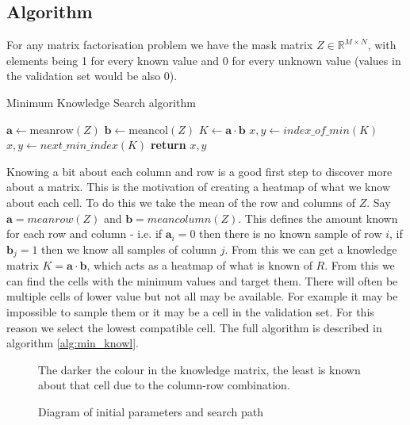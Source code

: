\subsection{Algorithm}
For any matrix factorisation problem we have the mask matrix $Z \in \mathbb{R}^{M \times N}$, with elements being 1 for every known value and 0 for every unknown value (values in the validation set would be also 0).

\begin{algorithm}
\caption{Minimum Knowledge Search algorithm}\label{alg:min_knowl}
\begin{algorithmic}[1]
\State $\mathbf{a} \gets \text{meanrow}(Z)$ 
\State $\mathbf{b} \gets \text{meancol}(Z)$ 
\State $K \gets \mathbf{a} \cdot \mathbf{b}$ 
\State $x,y \gets index\_of\_min(K)$ 
\State $x,y \gets next\_min\_index(K)$
\EndWhile
\State \textbf{return} $x,y$
\EndProcedure
\end{algorithmic}
\end{algorithm}

Knowing a bit about each column and row is a good first step to discover more about a matrix. This is the motivation of creating a heatmap of what we know about each cell. To do this we take the mean of the row and columns of $Z$. Say $\mathbf{a}=meanrow(Z)$ and $\mathbf{b}=meancolumn(Z)$. This defines the amount known for each row and column - i.e. if $\mathbf{a}_i = 0$ then there is no known sample of row $i$, if $\mathbf{b}_j = 1$ then we know all samples of column $j$. From this we can get a knowledge matrix $K= \mathbf{a} \cdot \mathbf{b}$, which acts as a heatmap of what is known of $R$. From this we can find the cells with the minimum values and target them. There will often be multiple cells of lower value but not all may be available. For example it may be impossible to sample them or it may be a cell in the validation set. For this reason we select the lowest compatible cell. The full algorithm is described in algorithm \ref{alg:min_knowl}.

\begin{figure}[!htbp]
  \begin{center}
    \resizebox{\textwidth}{!}{}
  \end{center}
  The darker the colour in the knowledge matrix, the least is known about that cell due to the column-row combination.
    \caption{Diagram of initial parameters and search path}
    \label{fig:min_know_search}
\end{figure}


